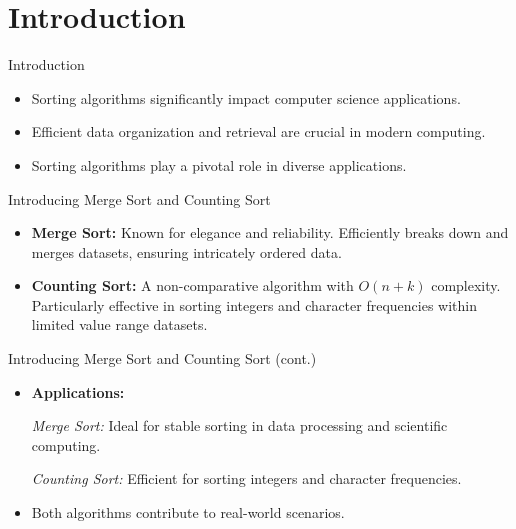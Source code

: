 \documentclass{beamer}
\begin{document}
	\section{Introduction}
	
	\begin{frame}{Introduction}
		\begin{itemize}
			\item Sorting algorithms significantly impact computer science applications.
	
			\item Efficient data organization and retrieval are crucial in modern computing.
			
			\item Sorting algorithms play a pivotal role in diverse applications.\cite{cormen2009introduction}
			
		\end{itemize}
	\end{frame}
	
	\begin{frame}{Introducing Merge Sort and Counting Sort}
		\begin{itemize}
			\item \textbf{Merge Sort:} Known for elegance and reliability. Efficiently breaks down and merges datasets, ensuring intricately ordered data.
			
			\item \textbf{Counting Sort:} A non-comparative algorithm with $O(n + k)$ complexity. Particularly effective in sorting integers and character frequencies within limited value range datasets.
		\end{itemize}
	\end{frame}
	
	\begin{frame}{Introducing Merge Sort and Counting Sort (cont.)}
		\begin{itemize}
			
			\item \textbf{Applications:}
			
			\textit{Merge Sort:} Ideal for stable sorting in data processing and scientific computing.
			
			\textit{Counting Sort:} Efficient for sorting integers and character frequencies.
			
			\item Both algorithms contribute to real-world scenarios.
		\end{itemize}
	\end{frame}
	
\end{document}
